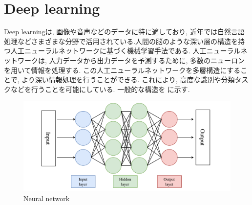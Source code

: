
\section{Deep learning}
Deep learningは, 画像や音声などのデータに特に適しており, 近年では自然言語処理などさまざまな分野で活用されている.人間の脳のような深い層の構造を持つ人工ニューラルネットワークに基づく機械学習手法である. 人工ニューラルネットワークは, 入力データから出力データを予測するために, 多数のニューロンを用いて情報を処理する. この人工ニューラルネットワークを多層構造にすることで, より深い情報処理を行うことができる. これにより, 高度な識別や分類タスクなどを行うことを可能にしている. 一般的な構造を  に示す.


\begin{figure}[hbtp]
  \centering
 \includegraphics[keepaspectratio, scale=0.4]
      {images/deeplearning_model.png}
 \caption{Neural network}
 \label{Fig:Neural network}
\end{figure}

\newpage
